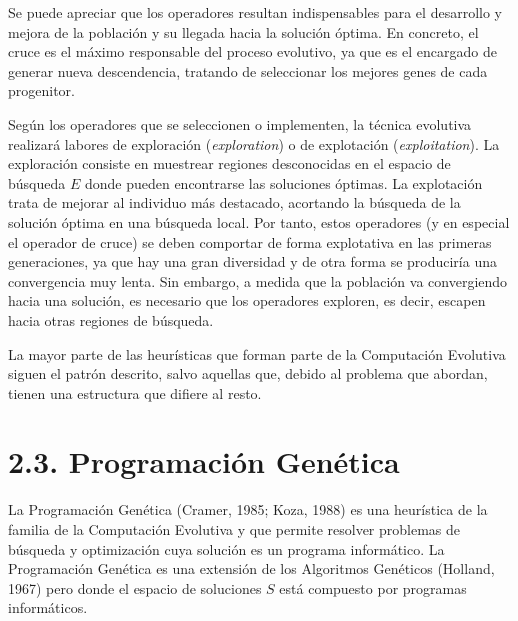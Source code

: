 \documentclass[spanish,a4paper,12pt,twoside]{report}
\begin{document}
  Se puede apreciar que los operadores resultan indispensables para el desarrollo y mejora de la población y su llegada hacia la solución óptima. En concreto, el cruce es el máximo responsable del proceso evolutivo, ya que es el encargado de generar nueva descendencia, tratando de seleccionar los mejores genes de cada progenitor. \par
  Según los operadores que se seleccionen o implementen, la técnica evolutiva realizará labores de exploración (\emph{exploration}) o de explotación (\emph{exploitation}). La exploración consiste en muestrear regiones desconocidas en el espacio de búsqueda $E$ donde pueden encontrarse las soluciones óptimas. La explotación trata de mejorar al individuo más destacado, acortando la búsqueda de la solución óptima en una búsqueda local. Por tanto, estos operadores (y en especial el operador de cruce) se deben comportar de forma explotativa en las primeras generaciones, ya que hay una gran diversidad y de otra forma se produciría una convergencia muy lenta. Sin embargo, a medida que la población va convergiendo hacia una solución, es necesario que los operadores exploren, es decir, escapen hacia otras regiones de búsqueda. \par
  La mayor parte de las heurísticas que forman parte de la Computación Evolutiva siguen el patrón descrito, salvo aquellas que, debido al problema que abordan, tienen una estructura que difiere al resto.
  
  \section*{\Large 2.3. Programación Genética}
  La Programación Genética (Cramer, 1985; Koza, 1988) es una heurística de la familia de la Computación Evolutiva y que permite resolver problemas de búsqueda y optimización cuya solución es un programa informático. La Programación Genética es una extensión de los Algoritmos Genéticos (Holland, 1967) pero donde el espacio de soluciones $S$ está compuesto por programas informáticos.
\end{document}
